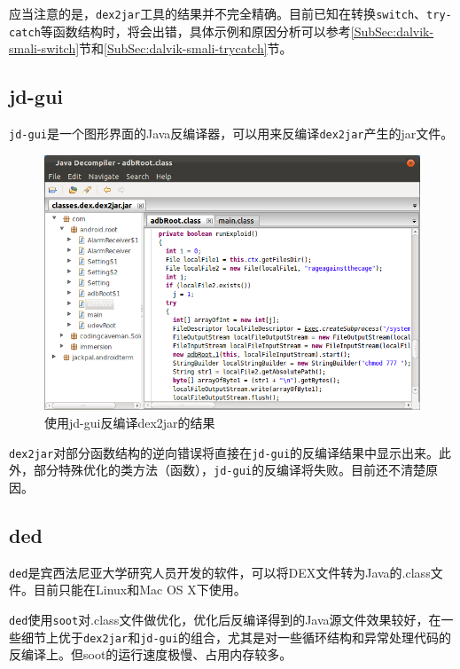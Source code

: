 应当注意的是，\lstinline!dex2jar!工具的结果并不完全精确。目前已知在转换\lstinline!switch!、\lstinline!try-catch!等函数结构时，将会出错，具体示例和原因分析可以参考\ref{SubSec:dalvik-smali-switch}节和\ref{SubSec:dalvik-smali-trycatch}节。

\subsection{jd-gui}
\lstinline!jd-gui!\cite{url:jd-gui}是一个图形界面的Java反编译器，可以用来反编译\lstinline!dex2jar!产生的jar文件。

\begin{figure}[htbp]
  \centering
  \includegraphics[width=14cm]{image/jd-gui.png}
  \caption{使用jd-gui反编译dex2jar的结果}
  \label{Fig:jd-gui}
\end{figure}

\lstinline!dex2jar!对部分函数结构的逆向错误将直接在\lstinline!jd-gui!的反编译结果中显示出来。此外，部分特殊优化的类方法（函数），\lstinline!jd-gui!的反编译将失败。目前还不清楚原因。

\subsection{ded}
\lstinline!ded!\cite{url:ded}是宾西法尼亚大学研究人员开发的软件，可以将DEX文件转为Java的.class文件。目前只能在Linux和Mac OS X下使用。

\lstinline!ded!使用\lstinline!soot!\cite{url:soot}对.class文件做优化，优化后反编译得到的Java源文件效果较好，在一些细节上优于\lstinline!dex2jar!和\lstinline!jd-gui!的组合，尤其是对一些循环结构和异常处理代码的反编译上。但soot的运行速度极慢、占用内存较多。

